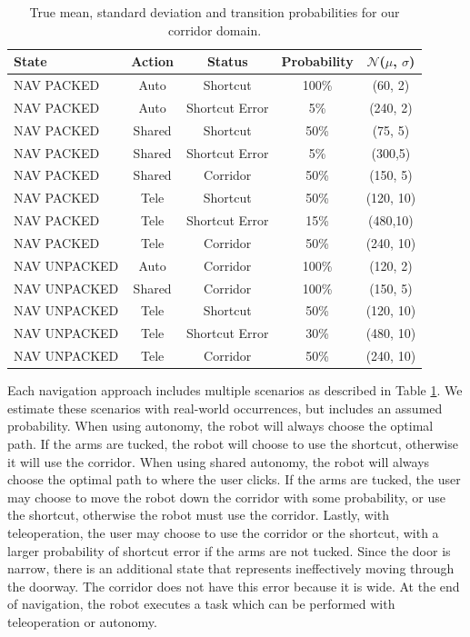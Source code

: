 \documentclass[letterpaper, 10 pt, conference]{ieeeconf}  %
\begin{document}
\begin{table}
\centering
\begin{tabular}{|l|c|c|c|c|}
\hline
State & Action & Status & Probability & $\mathcal{N}$($\mu$, $\sigma$) \\
\hline
NAV PACKED & Auto & Shortcut & 100\% & (60, 2)\\
\hline
NAV PACKED & Auto & Shortcut Error & 5\% & (240, 2)\\
\hline
NAV PACKED & Shared & Shortcut & 50\% & (75, 5)\\
\hline
NAV PACKED & Shared & Shortcut Error & 5\% & (300,5)\\
\hline
NAV PACKED & Shared & Corridor & 50\% & (150, 5)\\
\hline
NAV PACKED & Tele & Shortcut & 50\% & (120, 10)\\
\hline
NAV PACKED & Tele & Shortcut Error & 15\% & (480,10)\\
\hline
NAV PACKED & Tele & Corridor & 50\% & (240, 10) \\
\hline
NAV UNPACKED & Auto & Corridor & 100\% & (120, 2) \\
\hline
NAV UNPACKED & Shared & Corridor & 100\% & (150, 5) \\
\hline
NAV UNPACKED & Tele & Shortcut & 50\% & (120, 10)\\
\hline
NAV UNPACKED & Tele & Shortcut Error & 30\% & (480, 10)\\
\hline
NAV UNPACKED & Tele & Corridor & 50\% & (240, 10)\\
\hline
\end{tabular}
\caption{True mean, standard deviation and transition probabilities for our corridor domain.}
\label{IdealQTable}
\end{table}

Each navigation approach includes multiple scenarios as described in Table \ref{IdealQTable}. We estimate these scenarios with real-world occurrences, but includes an assumed probability. When using autonomy, the robot will always choose the optimal path. If the arms are tucked, the robot will choose to use the shortcut, otherwise it will use the corridor. When using shared autonomy, the robot will always choose the optimal path to where the user clicks. If the arms are tucked, the user may choose to move the robot down the corridor with some probability, or use the shortcut, otherwise the robot must use the corridor. Lastly, with teleoperation, the user may choose to use the corridor or the shortcut, with a larger probability of shortcut error if the arms are not tucked. Since the door is narrow, there is an additional state that represents ineffectively moving through the doorway. The corridor does not have this error because it is wide. At the end of navigation, the robot executes a task which can be performed with teleoperation or autonomy. 
\end{document}
